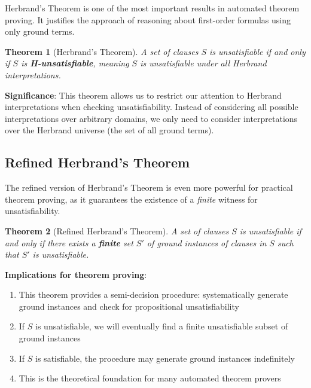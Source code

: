 \documentclass[11pt,a4paper]{article}
\theoremstyle{definition}
\theoremstyle{plain}
\newtheorem{theorem}{Theorem}[section]
\theoremstyle{remark}
\begin{document}
Herbrand's Theorem is one of the most important results in automated theorem proving. It justifies the approach of reasoning about first-order formulas using only ground terms.

\begin{tcolorbox}[colback=green!5!white,colframe=green!75!black,title=\textbf{Herbrand's Theorem}]
\begin{theorem}[Herbrand's Theorem]
A set of clauses $S$ is unsatisfiable if and only if $S$ is \textbf{H-unsatisfiable}, meaning $S$ is unsatisfiable under all Herbrand interpretations.
\end{theorem}
\end{tcolorbox}

\textbf{Significance}: This theorem allows us to restrict our attention to Herbrand interpretations when checking unsatisfiability. Instead of considering all possible interpretations over arbitrary domains, we only need to consider interpretations over the Herbrand universe (the set of all ground terms).

\subsection{Refined Herbrand's Theorem}

The refined version of Herbrand's Theorem is even more powerful for practical theorem proving, as it guarantees the existence of a \textit{finite} witness for unsatisfiability.

\begin{tcolorbox}[colback=blue!5!white,colframe=blue!75!black,title=\textbf{Refined Herbrand's Theorem}]
\begin{theorem}[Refined Herbrand's Theorem]
A set of clauses $S$ is unsatisfiable if and only if there exists a \textbf{finite} set $S'$ of ground instances of clauses in $S$ such that $S'$ is unsatisfiable.
\end{theorem}
\end{tcolorbox}

\textbf{Implications for theorem proving}:
\begin{enumerate}
    \item This theorem provides a semi-decision procedure: systematically generate ground instances and check for propositional unsatisfiability
    \item If $S$ is unsatisfiable, we will eventually find a finite unsatisfiable subset of ground instances
    \item If $S$ is satisfiable, the procedure may generate ground instances indefinitely
    \item This is the theoretical foundation for many automated theorem provers
\end{enumerate}
\end{document}
